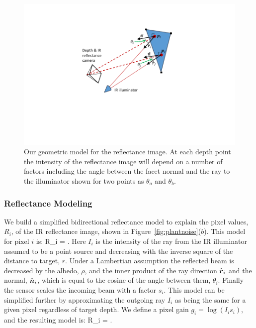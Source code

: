 \begin{figure}
\begin{center}
   \includegraphics[trim=100 100 100 40,clip,width=0.95\linewidth]{Figures/ShapeFromShading}
\end{center}
   \caption{Our geometric model for the reflectance image.  At each depth point the intensity of the reflectance image will depend on a number of factors including the angle between the facet normal and the ray to the illuminator shown for two points as $\theta_a$ and $\theta_b$. }
\label{fig:shapefromshading}
\end{figure}

\subsubsection{Reflectance Modeling}

We build a simplified bidirectional reflectance model to explain the pixel values, $R_i$, of the IR reflectance image, shown in Figure~\ref{fig:plantnoise}($b$).  This model for pixel $i$ is:
\beq
R_i = .\label{eq:reflectanceinit}
\eeq
Here $I_i$ is the intensity of the ray from the IR illuminator assumed to be a point source and decreasing with the inverse square of the distance to target, $r$. Under a Lambertian assumption the reflected beam is decreased by the albedo, $\rho$, and the inner product of the ray direction $\hat{\boldsymbol{r}}_i$ and the normal, $\hat{\boldsymbol{n}}_i$, which is equal to the cosine of the angle between them, $\theta_i$.  Finally the sensor scales the incoming beam with a factor $s_i$.  This model can be simplified further by approximating the outgoing ray $I_i$ as being the same for a given pixel regardless of target depth.  We define a pixel gain $g_i = \log(I_i s_i)$, and the resulting model is:
\beq
R_i = . \label{eq:reflectance}
\eeq

